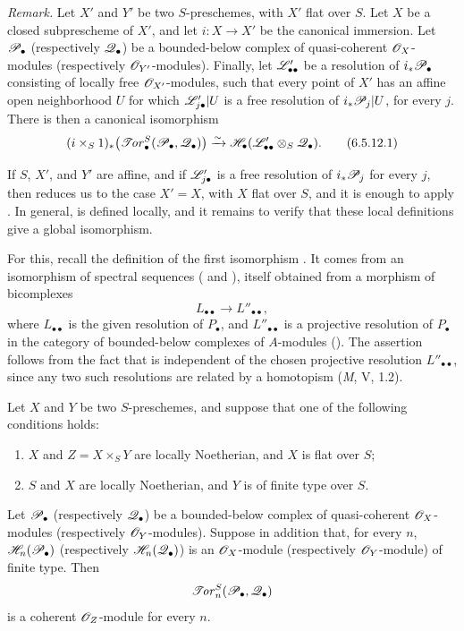 \begin{env}[6.5.12]
\label{III.6.5.12}
\emph{Remark.}
Let $X'$ and $Y'$ be two $S$-preschemes, with $X'$ flat over
$S$.  Let $X$ be a closed subprescheme of $X'$, and let
$i:X\to X'$ be the canonical immersion.  Let $\mathscr{P}_\bullet$
(respectively $\mathscr{Q}_\bullet$) be a bounded-below complex of
quasi-coherent $\mathscr{O}_X$-modules (respectively
$\mathscr{O}_{Y'}$-modules).  Finally, let $\mathscr{L}'_{\bullet\bullet}$
be a resolution of $i_*\mathscr{P}_\bullet$ consisting of locally free
$\mathscr{O}_{X'}$-modules, such that every point of $X'$ has an
affine open neighborhood $U$ for which
$\mathscr{L}'_{j\bullet}|U$ is a free resolution of
$i_*\mathscr{P}_j|U$, for every $j$.  There is then a canonical
isomorphism
\[
  (i\times_S1)_*
  \bigl(\mathscr{T}\!\mathit{or}_\bullet^S(\mathscr{P}_\bullet,\mathscr{Q}_\bullet)\bigr)
  \xrightarrow{\sim}
  \mathscr{H}_\bullet(\mathscr{L}'_{\bullet\bullet}\otimes_S\mathscr{Q}_\bullet).
  \tag{6.5.12.1}\label{III.6.5.12.1}
\]

If $S$, $X'$, and $Y'$ are affine, and if
$\mathscr{L}'_{j\bullet}$ is a free resolution of $i_*\mathscr{P}_j$ for
every $j$, then  reduces us to the case
$X'=X$, with $X$ flat over $S$, and it is enough to apply
.  In general,  is defined
locally, and it remains to verify that these local definitions
give a global isomorphism.

For this, recall the definition of the first isomorphism
.  It comes from an isomorphism of spectral
sequences ( and ), itself
obtained from a morphism of bicomplexes
\[
  L_{\bullet\bullet}\longrightarrow L''_{\bullet\bullet},
\]
where $L_{\bullet\bullet}$ is the given resolution of
$P_\bullet$, and
$L''_{\bullet\bullet}$ is a projective resolution of
$P_\bullet$ in the category of bounded-below complexes of
$A$-modules ().  The assertion follows from
the fact that  is independent of the chosen
projective resolution $L''_{\bullet\bullet}$, since any two such
resolutions are related by a homotopism (\emph{M}, V, 1.2).
\end{env}

\begin{proposition}[6.5.13]
\label{III.6.5.13}
Let $X$ and $Y$ be two $S$-preschemes, and suppose that one of
the following conditions holds:
\begin{enumerate}
  \item[(i)] $X$ and $Z=X\times_SY$ are locally Noetherian, and
    $X$ is flat over $S$;
  \item[(ii)] $S$ and $X$ are locally Noetherian, and $Y$ is of
    finite type over $S$.
\end{enumerate}
Let $\mathscr{P}_\bullet$ (respectively $\mathscr{Q}_\bullet$) be a
bounded-below complex of quasi-coherent $\mathscr{O}_X$-modules
(respectively $\mathscr{O}_Y$-modules).  Suppose in addition that, for
every $n$, $\mathscr{H}_n(\mathscr{P}_\bullet)$ (respectively
$\mathscr{H}_n(\mathscr{Q}_\bullet)$) is an $\mathscr{O}_X$-module
(respectively $\mathscr{O}_Y$-module) of finite type.  Then
\[
  \mathscr{T}\!\mathit{or}_n^S(\mathscr{P}_\bullet,\mathscr{Q}_\bullet)
\]
is a coherent $\mathscr{O}_Z$-module for every $n$.
\end{proposition}

